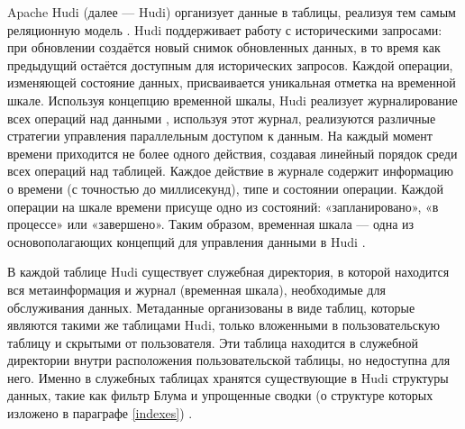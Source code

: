 Apache Hudi (далее --- Hudi) организует данные в таблицы, реализуя тем самым реляционную модель \cite{Database_systems_Garcia_Molina}. Hudi поддерживает работу с историческими запросами: при обновлении создаётся новый снимок обновленных данных, в то время как предыдущий остаётся доступным для исторических запросов. Каждой операции, изменяющей состояние данных, присваивается уникальная отметка на временной шкале. Используя концепцию временной шкалы, Hudi реализует журналирование всех операций над данными , используя этот журнал, реализуются различные стратегии управления параллельным доступом к данным. На каждый момент времени приходится не более одного действия, создавая линейный порядок среди всех операций над таблицей. Каждое действие в журнале содержит информацию о времени (с точностью до миллисекунд), типе и состоянии операции. Каждой операции на шкале времени присуще одно из состояний: «запланировано», «в процессе» или «завершено». Таким образом, временная шкала --- одна из основополагающих концепций для управления данными в Hudi \cite{Hudi_Timeline}.

В каждой таблице Hudi существует служебная директория, в которой находится вся метаинформация и журнал (временная шкала), необходимые для обслуживания данных. Метаданные организованы в виде таблиц, которые  являются такими же таблицами Hudi, только вложенными в пользовательскую таблицу и скрытыми от пользователя. Эти таблица находится в служебной директории внутри расположения пользовательской таблицы, но недоступна для него. Именно в служебных таблицах хранятся существующие в Hudi структуры данных, такие как фильтр Блума и упрощенные сводки (о структуре которых изложено в параграфе \ref{indexes}) \cite{Hudi_Metadata}.

